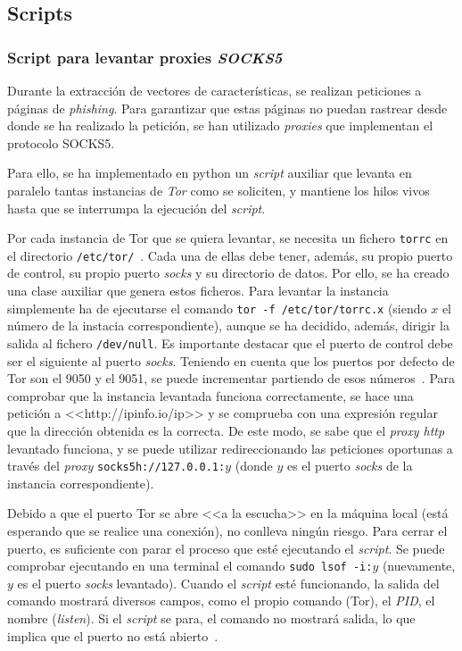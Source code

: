 \subsection{Scripts} 
\subsubsection{Script para levantar proxies \textit{SOCKS5}}

Durante la extracción de vectores de características, se realizan peticiones a páginas de \textit{phishing}. Para garantizar que estas páginas no puedan rastrear desde donde se ha realizado la petición, se han utilizado \textit{proxies} que implementan el protocolo SOCKS5.

Para ello, se ha implementado en python un \textit{script} auxiliar que levanta en paralelo tantas instancias de \textit{Tor} como se soliciten, y mantiene los hilos vivos hasta que se interrumpa la ejecución del \textit{script}.

Por cada instancia de Tor que se quiera levantar, se necesita un fichero \texttt{torrc} en el directorio \texttt{/etc/tor/}~\cite{TorFicherosTor}. Cada una de ellas debe tener, además, su propio puerto de control, su propio puerto \textit{socks} y su directorio de datos. Por ello, se ha creado una clase auxiliar que genera estos ficheros. Para levantar la instancia simplemente ha de ejecutarse el comando \texttt{tor -f /etc/tor/torrc.x} (siendo $x$ el número de la instacia correspondiente), aunque se ha decidido, además, dirigir la salida al fichero \texttt{/dev/null}. Es importante destacar que el puerto de control debe ser el siguiente al puerto \textit{socks}. Teniendo en cuenta que los puertos por defecto de Tor son el 9050 y el 9051, se puede incrementar partiendo de esos números~\cite{TorficheroComando}. Para comprobar que la instancia levantada funciona correctamente, se hace una petición a <<http://ipinfo.io/ip>> y se comprueba con una expresión regular que la dirección obtenida es la correcta. De este modo, se sabe que el \textit{proxy http} levantado funciona, y se puede utilizar redireccionando las peticiones oportunas a través del \textit{proxy} \texttt{socks5h://127.0.0.1:$y$} (donde $y$ es el puerto \textit{socks} de la instancia correspondiente). 

Debido a que el puerto Tor se abre <<a la escucha>> en la máquina local (está esperando que se realice una conexión), no conlleva ningún riesgo. Para cerrar el puerto, es suficiente con parar el proceso que esté ejecutando el \textit{script}. Se puede comprobar ejecutando en una terminal el comando \texttt{sudo lsof -i:$y$} (nuevamente, $y$ es el puerto \textit{socks} levantado). Cuando el \textit{script} esté funcionando, la salida del comando mostrará diversos campos, como el propio comando (Tor), el \textit{PID}, el nombre (\textit{listen}). Si el \textit{script} se para, el comando no mostrará salida, lo que implica que el puerto no está abierto~\cite{checkOpenTorPorts}.